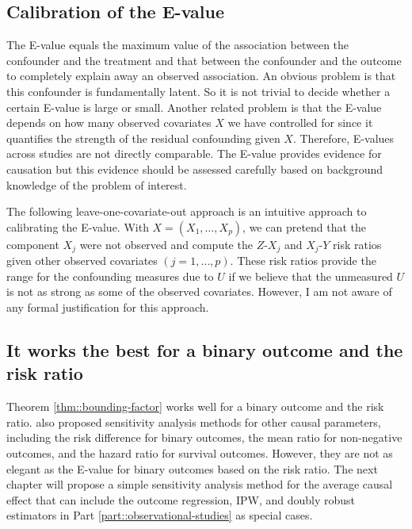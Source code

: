\subsection{Calibration of the E-value}



The E-value equals the maximum value of the association between the confounder and the treatment and that between the confounder and the outcome to completely explain away an observed association. An obvious problem is that this confounder is fundamentally latent. So it is not trivial to decide whether a certain E-value is large or small. 
Another related problem is that the E-value depends on how many observed covariates $X$ we have controlled for since it quantifies the strength of the residual confounding given $X$. Therefore, E-values across studies are not directly comparable. The E-value provides evidence for causation but this evidence should be assessed carefully based on background knowledge of the problem of interest. 


The following leave-one-covariate-out approach is an intuitive approach to calibrating the E-value. With $X = (X_1, \ldots, X_p)$, we can pretend that the component $X_j$ were not observed and compute the $Z$-$X_j$ and $X_j$-$Y$ risk ratios given other observed covariates $(j=1, \ldots, p)$. These risk ratios provide the range for the confounding measures due to $U$ if we believe that the unmeasured $U$ is not as strong as some of the observed covariates. However, I am not aware of any formal justification for this approach. 



\subsection{It works the best for  a binary outcome and the risk ratio}


Theorem \ref{thm::bounding-factor} works well for a binary outcome and the risk ratio.  \citet{ding2016sensitivity} also proposed sensitivity analysis methods for other causal parameters, including the risk difference for binary outcomes, the mean ratio for non-negative outcomes, and the hazard ratio for survival outcomes. However, they are not as elegant as the E-value for binary outcomes based on the risk ratio. The next chapter will propose a simple sensitivity analysis method for the average causal effect that can include the outcome regression, IPW, and doubly robust estimators in Part \ref{part::observational-studies} as special cases. 






